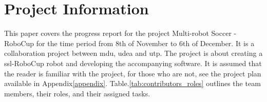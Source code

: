 \section{Project Information}

This paper covers the progress report for the project Multi-robot Soccer - RoboCup for the time period from 8th of November to 6th of December. 
It is a collaboration project between \ac{mdu}, \ac{udea} and \ac{utp}. 
The project is about creating a \ac{ssl}-RoboCup robot and developing the accompanying software.
It is assumed that the reader is familiar with the project, for those who are not, see the project plan available in Appendix\:\ref{appendix}.
Table.\:\ref{tab:contributors_roles} outlines the team members, their roles, and their assigned tasks.
